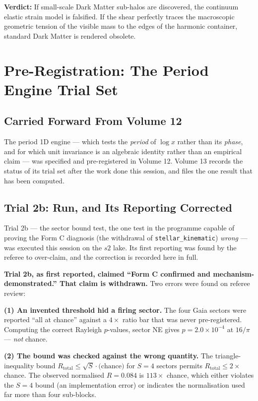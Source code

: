 \documentclass[11pt, letterpaper, openany]{book}
\begin{document}
\textbf{Verdict:} If small-scale Dark Matter sub-halos are discovered, the continuum elastic strain model is falsified. If the shear perfectly traces the macroscopic geometric tension of the visible mass to the edges of the harmonic container, standard Dark Matter is rendered obsolete.

\chapter{Pre-Registration: The Period Engine Trial Set}

\section{Carried Forward From Volume 12}

The period 1D engine --- which tests the \emph{period} of $\log x$ rather than its \emph{phase},
and for which unit invariance is an algebraic identity rather than an empirical claim --- was
specified and pre-registered in Volume 12. Volume 13 records the status of its trial set after
the work done this session, and files the one result that has been computed.

\section{Trial 2b: Run, and Its Reporting Corrected}

Trial 2b --- the sector bound test, the one test in the programme capable of proving the Form C
diagnosis (the withdrawal of \texttt{stellar\_kinematic}) \emph{wrong} --- was executed this
session on the $s2$ lake. Its first reporting was found by the referee to over-claim, and the
correction is recorded here in full.

\begin{correctionbox}
\textbf{Trial 2b, as first reported, claimed ``Form C confirmed and mechanism-demonstrated.''
That claim is withdrawn.} Two errors were found on referee review:

\medskip
\textbf{(1) An invented threshold hid a firing sector.} The four Gaia sectors were reported ``all
at chance'' against a $4\times$ ratio bar that was never pre-registered. Computing the correct
Rayleigh $p$-values, sector NE gives $p = 2.0\times10^{-4}$ at $16/\pi$ --- \emph{not} chance. 

\medskip
\textbf{(2) The bound was checked against the wrong quantity.} The triangle-inequality bound
$R_{\mathrm{total}} \leq \sqrt{S}\cdot\text{(chance)}$ for $S=4$ sectors permits
$R_{\mathrm{total}} \leq 2\times$ chance. The observed normalised $R = 0.084$ is $113\times$ chance,
which either violates the $S=4$ bound (an implementation error) or indicates the normalisation used
far more than four sub-blocks. 
\end{correctionbox}
\end{document}
